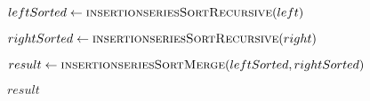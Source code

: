 \begin{frame}[containsverbatim]{\insertionseriesexampleframe}
\begin{columns}[c]
\begin{column}{0.4\textwidth}
{\begin{minipage}[c]{\textwidth}
\begin{algorithm}[H]
\begin{algorithmic}[1]
                                            \label{insertionseriesSortRecursive before leftSorted}
                                            \State $leftSorted \gets \Call{insertionseriesSortRecursive}{left}$
                                            \label{insertionseriesSortRecursive after leftsorted}
                                            
                                            \label{insertionseriesSortRecursive before rightSorted}
                                            \State $rightSorted \gets \Call{insertionseriesSortRecursive}{right}$
                                            \label{insertionseriesSortRecursive after rightsorted}
                                            
                                            \label{insertionseriesSortRecursive before insertionseriesSortMerge result}
                                            \State $result \gets \Call{insertionseriesSortMerge}{leftSorted, rightSorted}$
                                            \label{insertionseriesSortRecursive after insertionseriesSortMerge result}
                    
                                            \State \Return $result$
                                        \EndFunction
                                    \end{algorithmic}
                                \end{algorithm}
                            \endgroup
                        \end{minipage}
                    }
                \end{column}

                \begin{column}{0.6\textwidth}
                    \vspace{-0.2cm}
                    \tiny
                    \noindent {}
\end{column}
\end{columns}
\end{frame}
